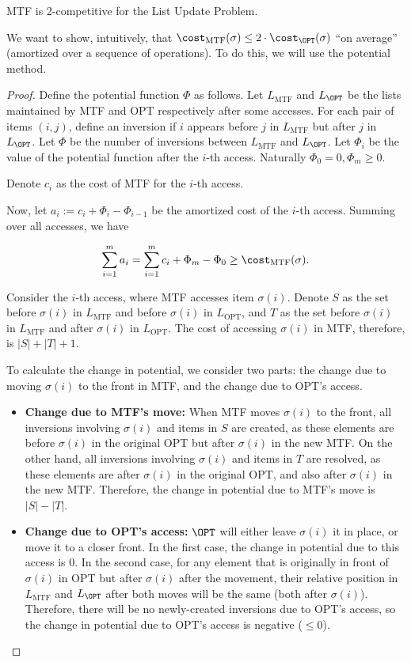 \begin{theorem}
  MTF is 2-competitive for the List Update Problem.
\end{theorem}

We want to show, intuitively, that $\cost_{\text{MTF}}(\sigma) \leq 2 \cdot \cost_{\OPT}(\sigma)$ ``on average'' (amortized over a sequence of operations). To do this, we will use the potential method.

\begin{proof}
Define the potential function $\Phi$ as follows. Let $L_{\text{MTF}}$ and $L_{\OPT}$ be the lists maintained by MTF and OPT respectively after some accesses. For each pair of items $(i, j)$, define an inversion if $i$ appears before $j$ in $L_{\text{MTF}}$ but after $j$ in $L_{\OPT}$. Let $\Phi$ be the number of inversions between $L_{\text{MTF}}$ and $L_{\OPT}$. Let $\Phi_i$ be the value of the potential function after the $i$-th access. Naturally $\Phi_0 = 0, \Phi_m \geq 0$.

Denote $c_i$ as the cost of MTF for the $i$-th access.

Now, let $a_i := c_i + \Phi_i - \Phi_{i-1}$ be the amortized cost of the $i$-th access. Summing over all accesses, we have

\[ \sum_{i=1}^m a_i = \sum_{i=1}^m c_i + \Phi_m - \Phi_0 \geq \cost_{\text{MTF}}(\sigma). \]

Consider the $i$-th access, where MTF accesses item $\sigma(i)$. Denote $S$ as the set before $\sigma(i)$ in $L_\text{MTF}$ and before $\sigma(i)$ in $L_\text{OPT}$, and $T$ as the set before $\sigma(i)$ in $L_\text{MTF}$ and after $\sigma(i)$ in $L_\text{OPT}$.
The cost of accessing $\sigma(i)$ in MTF, therefore, is $|S|+|T|+1$.

To calculate the change in potential, we consider two parts: the change due to moving $\sigma(i)$ to the front in MTF, and the change due to OPT's access.

\begin{itemize}
  \item \textbf{Change due to MTF's move:} When MTF moves $\sigma(i)$ to the front, all inversions involving $\sigma(i)$ and items in $S$ are created, as these elements are before $\sigma(i)$ in the original OPT but after $\sigma(i)$ in the new MTF. On the other hand, all inversions involving $\sigma(i)$ and items in $T$ are resolved, as these elements are after $\sigma(i)$ in the original OPT, and also after $\sigma(i)$ in the new MTF. Therefore, the change in potential due to MTF's move is $|S| - |T|$.
  \item \textbf{Change due to OPT's access:} $\OPT$ will either leave $\sigma(i)$ it in place, or move it to a closer front. In the first case, the change in potential due to this access is 0. In the second case, for any element that is originally in front of $\sigma(i)$ in OPT but after $\sigma(i)$ after the movement, their relative position in $L_{\text{MTF}}$ and $L_{\OPT}$ after both moves will be the same (both after $\sigma(i)$). Therefore, there will be no newly-created inversions due to OPT's access, so the change in potential due to OPT's access is negative ($\leq 0$).
\end{itemize}


\end{proof}
